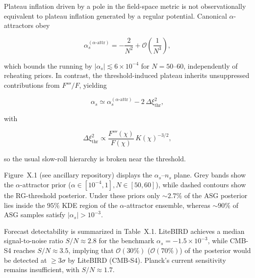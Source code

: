 \documentclass[
]{article}
\begin{document}
Plateau inflation driven by a pole in the field-space metric is not
observationally equivalent to plateau inflation generated by a regular
potential. Canonical \(\alpha\)-attractors obey

\[
\alpha_{s}^{(\alpha\text{-attr})} = - \frac{2}{N^{2}} + \mathcal{O}\!\left(\frac{1}{N^{3}}\right),
\]

which bounds the running by \(|\alpha_{s}| \lesssim 6 \times 10^{- 4}\)
for \(N = 50\)--\(60\), independently of reheating priors. In contrast,
the threshold-induced plateau inherits unsuppressed contributions from
\(F'''/F\), yielding

\[
\alpha_{s} \simeq \alpha_{s}^{(\alpha\text{-attr})} - 2\, \Delta \xi_{\text{thr}}^{2},
\]

with

\[
\Delta \xi_{\text{thr}}^{2} \propto \frac{F'''(\chi)}{F(\chi)}\, K(\chi)^{- 3/2},
\]

so the usual slow-roll hierarchy is broken near the threshold.

Figure~X.1 (see ancillary repository) displays the
\(\alpha_{s}\)--\(n_{s}\) plane. Grey bands show the
\(\alpha\)-attractor prior (\(\alpha \in [10^{- 4},1], N \in [50,60]\)),
while dashed contours show the RG-threshold posterior. Under these
priors only \(\sim 2.7\%\) of the ASG posterior lies inside the \(95\%\)
KDE region of the \(\alpha\)-attractor ensemble, whereas \(\sim 90\%\)
of ASG samples satisfy \(|\alpha_{s}| > 10^{- 3}\).

Forecast detectability is summarized in Table~X.1. LiteBIRD achieves a
median signal-to-noise ratio \(S/N \approx 2.8\) for the benchmark
\(\alpha_{s} = - 1.5 \times 10^{- 3}\), while CMB-S4 reaches
\(S/N \approx 3.5\), implying that \(\mathcal{O}(30\%)\)
(\(\mathcal{O}(70\%)\)) of the posterior would be detected at
\(\ge 3\sigma\) by LiteBIRD (CMB-S4). Planck's current sensitivity
remains insufficient, with \(S/N \approx 1.7\).
\end{document}
